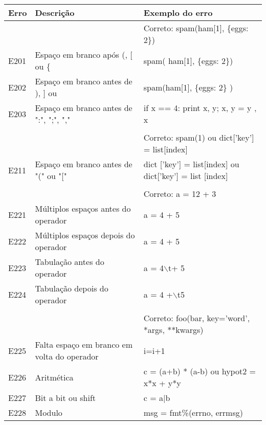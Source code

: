 	\begin{table}
		\tiny
		\begin{tabularx}{\linewidth}{ |l|X|X| }
			\hline
			\textbf{Erro}
			& \textbf{Descrição}
			& \textbf{Exemplo do erro} \\
			\hline
			
			& 
			& Correto: spam(ham[1], \{eggs: 2\}) \\ 
			\hline
			E201 
			& Espaço em branco após (, [ ou \{ 
			& spam( ham[1], \{eggs: 2\}) \\ 
			\hline
			E202 
			& Espaço em branco antes de ), ] ou   
			& spam(ham[1], \{eggs: 2\} ) \\ 
			\hline
			E203 
			& Espaço em branco antes de ":", ";", "," 
			& if x == 4: print x, y; x, y = y , x \\ 
			\hline
			
			& 
			&  \\ 
			\hline
			
			& 
			& Correto: spam(1) ou dict['key'] = list[index] \\ 
			\hline
			E211 
			& Espaço em branco antes de "(" ou "[" 
			& dict ['key'] = list[index] ou dict['key'] = list [index] \\ 
			\hline
			
			& 
			&  \\ 
			\hline
			
			& 
			& Correto: a = 12 + 3 \\ 
			\hline
			E221 
			& Múltiplos espaços antes do operador 
			& a = 4  + 5 \\ 
			\hline
			E222 
			& Múltiplos espaços depois do operador 
			& a = 4 +  5 \\ 
			\hline
			E223 
			& Tabulação antes do operador 
			& a = 4$\backslash$t+ 5 \\ 
			\hline
			E224 
			& Tabulação depois do operador 
			& a = 4 +$\backslash$t5 \\ 
			\hline
			
			& 
			&  \\ 
			\hline
			
			& 
			& Correto: foo(bar, key='word', *args, **kwargs) \\ 
			\hline
			E225 
			& Falta espaço em branco em volta do operador 
			& i=i+1 \\ 
			\hline
			E226 
			& Aritmética 
			& c = (a+b) * (a-b) ou hypot2 = x*x + y*y \\ 
			\hline
			E227 
			& Bit a bit ou shift 
			& c = a|b \\ 
			\hline
			E228 
			& Modulo 
			& msg = fmt\%(errno, errmsg) \\ 
			\hline
			

\end{tabularx}
\end{table}
